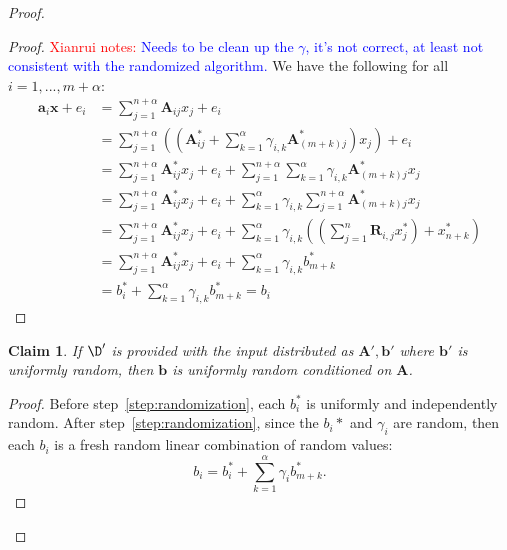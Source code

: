 \documentclass[11pt]{article}
\newcommand{\vect}[1]{\ensuremath{\textbf{#1}}}
\newtheorem{claim}[theorem]{Claim}
\newcommand{\authnote}[2]{{\textcolor{red}{\textsf{#1 notes: }\textcolor{blue}{ #2}}\marginpar{\textcolor{red}{\textbf{!!!!!}}}}}
\newcommand{\authnote}[2]{}
\newcommand{\xnote}[1]{{\authnote{Xianrui}{#1}}}
\newcommand{\vA}{\vect{A}}
\newcommand{\vR}{\vect{R}}
\newcommand{\vx}{\vect{x}}
\newcommand{\va}{\vect{a}}
\newcommand{\vb}{\vect{b}}
\begin{document}
{\begin{proof}
\begin{proof}
\xnote{Needs to be clean up the $\gamma$, it's not correct, at least not consistent with the randomized algorithm.}
We have the following for all $i=1,..., m+\alpha$:
\begin{align*}
\va_i \vx + e_i &= \sum_{j=1}^{n+\alpha} \vA_{ij} x_j + e_i\\
& = \sum_{j=1}^{n+\alpha}\left(\left(\vA^*_{ij}+\sum_{k=1}^\alpha \gamma_{i, k} \vA^*_{(m+k)j}\right)x_j\right) + e_i\\
& = \sum_{j=1}^{n+\alpha}\vA^*_{ij}x_j + e_i + \sum_{j=1}^{n+\alpha}\sum_{k=1}^\alpha \gamma_{i, k} \vA^*_{(m+k)j}x_j \\
& = \sum_{j=1}^{n+\alpha}\vA^*_{ij}x_j + e_i + \sum_{k=1}^\alpha  \gamma_{i, k} \sum_{j=1}^{n+\alpha} \vA^*_{(m+k)j}x_j\\
& = \sum_{j=1}^{n+\alpha}\vA^*_{ij}x_j + e_i + \sum_{k=1}^\alpha \gamma_{i, k} \left(\left( \sum_{j=1}^n \vR_{i, j}x_j^* \right) + x_{n+k}^*\right)\\
& = \sum_{j=1}^{n+\alpha}\vA^*_{ij}x_j + e_i + \sum_{k=1}^\alpha\gamma_{i, k} b_{m+k}^*\\
&= b_i^* +\sum_{k=1}^\alpha\gamma_{i,k} b_{m+k}^*= b_i
\end{align*}
\end{proof}
\begin{claim} 
\label{clm:random b}
If $\D'$ is provided with the input distributed as $\vA', \vb'$ where $\vb'$ is uniformly random, then $\vb$ is uniformly random conditioned on $\vA$.
\end{claim}
\begin{proof}
Before step~\ref{step:randomization}, each $b_i^*$ is uniformly and independently random.  After step~\ref{step:randomization}, since the $b_i*$ and $\gamma_i$ are random, then each $b_i$ is a fresh random linear combination of random values:
\[
b_i = b_i^* + \sum_{k=1}^\alpha \gamma_i b_{m+k}^*.
\]


\end{proof}
\end{proof}}
\end{document}
